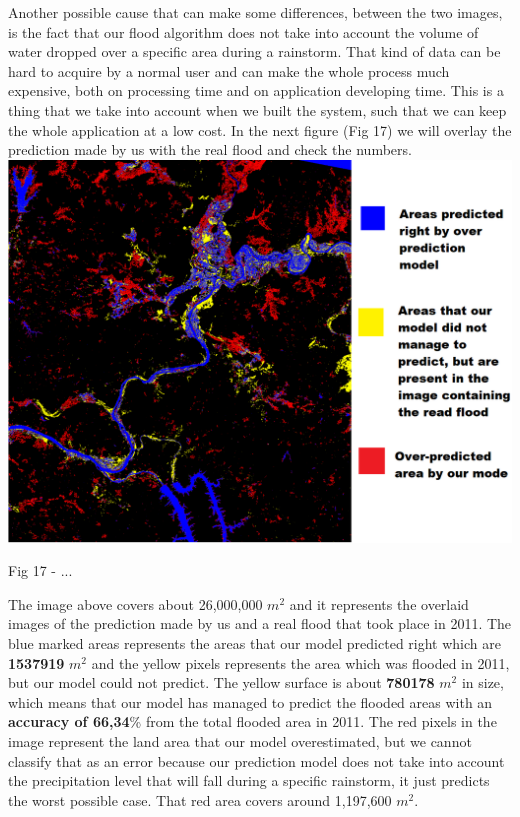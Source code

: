 \documentclass[12pt, a4paper]{report}
\begin{document}
Another possible cause that can make some differences, between the two images, is the fact that our flood algorithm does not take into account the volume of water dropped over a specific area during a rainstorm. That kind of data can be hard to acquire by a normal user and can make the whole process much expensive, both on processing time and on application developing time. This is a thing that we take into account when we built the system, such that we can keep the whole application at a low cost. In the next figure (Fig 17) we will overlay the prediction made by us with the real flood and check the numbers.
\medskip
\includegraphics[scale=0.6, center]{processed_flood_combined.png}
\begin{center}
Fig 17 - ... 
\end{center}
\par 

The image above covers about 26,000,000 $m^2$ and it represents the overlaid images of the prediction made by us and a real flood that took place in 2011. The blue marked areas  represents the areas that our model predicted right which are \textbf{1537919} $m^2$ and the yellow pixels represents the area which was flooded in 2011, but our model could not predict. The yellow surface is about \textbf{780178} $m^2$ in size, which means that our model has managed to predict the flooded areas with an \textbf{accuracy of 66,34}\% from the total flooded area in 2011. The red pixels in the image represent the land area that our model overestimated, but we cannot classify that as an error because our prediction model does not take into account the precipitation level that will fall during a specific rainstorm, it just predicts the worst possible case. That red area covers around 1,197,600 $m^2$.
\end{document}
